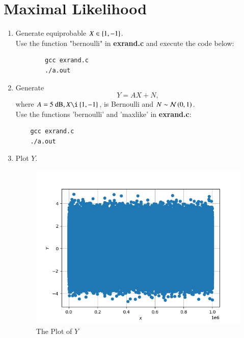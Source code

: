 \documentclass[journal,12pt,twocolumn]{IEEEtran}
\renewcommand\thesection{\arabic{section}}
\begin{document}
\section{Maximal Likelihood}
\begin{enumerate}[label=\thesection.\arabic*
    ,ref=\thesection.\theenumi]


    \item Generate equiprobable $X \in \left\{1,-1\right\}$.
    \\
    \solution
    Use the function "bernoulli" in \textbf{exrand.c} and execute the code below:
    \begin{lstlisting}
        gcc exrand.c
        ./a.out
    \end{lstlisting}



\item Generate 
    \begin{equation}
    Y = AX+N,
    \end{equation}
            where $A = 5 \text{ dB}, X \i \cbrak{1,-1}$,  is Bernoulli and $N \sim \mathcal{N}\left(0,1\right)$.
    \\
    \solution Use the functions 'bernoulli' and 'maxlike' in \textbf{exrand.c}:

\begin{lstlisting}
    gcc exrand.c
    ./a.out
\end{lstlisting}



\item Plot $Y$.

\begin{figure}
    \centering
    \includegraphics[width=\columnwidth]{./figures/Noise.png}
    \caption{The Plot of $Y$}
    \label{fig:noise}
    \end{figure}


\end{enumerate}
\end{document}
